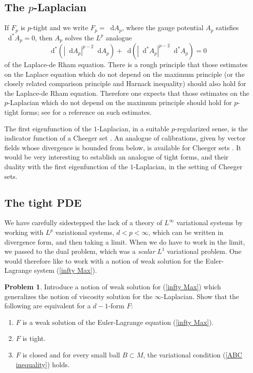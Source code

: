 \documentclass[reqno,11pt]{amsart}
\newcommand*\dif{\mathop{}\!\mathrm{d}}
\theoremstyle{definition}
\newtheorem{problem}[theorem]{Problem}
\numberwithin{equation}{section}
\begin{document}
\subsection{The \texorpdfstring{$p$-Laplacian}{p-Laplacian}}
If $F_p$ is $p$-tight and we write $F_p = \dif A_p$, where the gauge potential $A_p$ satisfies $\dif^* A_p = 0$, then $A_p$ solves the $L^p$ analogue 
$$\dif^*(|\dif A_p|^{p - 2} \dif A_p) + \dif(|\dif^* A_p|^{p - 2} \dif^* A_p) = 0$$
of the Laplace-de Rham equation. 
There is a rough principle that those estimates on the Laplace equation which do not depend on the maximum principle (or the closely related comparison principle and Harnack inequality) should also hold for the Laplace-de Rham equation.
Therefore one expects that those estimates on the $p$-Laplacian which do not depend on the maximum principle should hold for $p$-tight forms; see \cite[Chapter 11]{kinnunen2021maximal} for a reference on such estimates.

The first eigenfunction of the $1$-Laplacian, in a suitable $p$-regularized sense, is the indicator function of a Cheeger set \cite{Kawohl2003}.
An analogue of calibrations, given by vector fields whose divergence is bounded from below, is available for Cheeger sets \cite{Grieser05}.
It would be very interesting to establish an analogue of tight forms, and their duality with the first eigenfunction of the $1$-Laplacian, in the setting of Cheeger sets. 

\subsection{The tight PDE}
We have carefully sidestepped the lack of a theory of $L^\infty$ variational systems by working with $L^p$ variational systems, $d < p < \infty$, which can be written in divergence form, and then taking a limit.
When we do have to work in the limit, we passed to the dual problem, which was a \emph{scalar} $L^1$ variational problem.
One would therefore like to work with a notion of weak solution for the Euler-Lagrange system (\ref{infty Max}).

\begin{problem}
Introduce a notion of weak solution for (\ref{infty Max}) which generalizes the notion of viscosity solution for the $\infty$-Laplacian.
Show that the following are equivalent for a $d - 1$-form $F$:
\begin{enumerate}
\item $F$ is a weak solution of the Euler-Lagrange equation (\ref{infty Max}).
\item $F$ is tight.
\item $F$ is closed and for every small ball $B \subset M$, the variational condition (\ref{ABC inequality}) holds.
\end{enumerate}
\end{problem}
\end{document}
